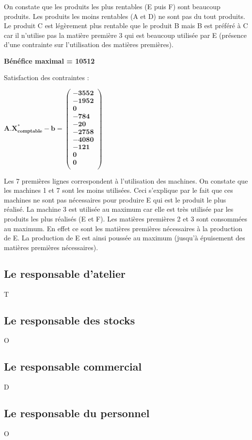 \documentclass[12pt]{article}
\begin{document}
On constate que les produits les plus rentables (E puis F) sont beaucoup produits. Les produits
les moins rentables (A et D) ne sont pas du tout produits. Le produit C est légèrement plus rentable que le produit B mais B est préféré à C car il n'utilise pas la matière première 3 qui est beaucoup utilisée par E (présence d'une contrainte sur l'utilisation des matières premières).
\\
\begin{center}
\textbf{Bénéfice maximal = 10512}
\end{center}

Satisfaction des contraintes : 
\begin{center}
$\mathbf{A.X^{*}_{comptable} - b = 
   \left (
   \begin{array}{c}
      -3552 \\
      -1952 \\
      0 \\
      -784 \\
      -20 \\
      -2758 \\
      -4080 \\
      -121 \\
      0 \\
      0\\
   \end{array}
   \right )
 } $ 
\end{center}
Les 7 premières lignes correspondent à l’utilisation des machines. On constate que les
machines 1 et 7 sont les moins utilisées. Ceci s’explique par le fait que ces machines ne sont
pas nécessaires pour produire E qui est le produit le plus réalisé. La machine 3 est utilisée au maximum car elle est très utilisée par les produits les plus réalisés (E et F). Les matières premières 2 et 3 sont consommées au maximum. En effet ce sont les matières premières nécessaires à la production de E. La production de E est ainsi poussée au maximum (jusqu'à épuisement des matières premières nécessaires).

\subsection{Le responsable d'atelier}
T
\subsection{Le responsable des stocks}
O
\subsection{Le responsable commercial}
D
\subsection{Le responsable du personnel}
O



\end{document}
